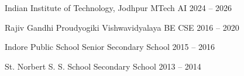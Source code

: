\educationSubsection
    {Indian Institute of Technology, Jodhpur}
    {MTech AI}
    {2024 -- 2026}
   
\educationSubsection
    {Rajiv Gandhi Proudyogiki Vishwavidyalaya}
    {BE CSE}
    {2016 -- 2020}
   
\educationSubsection
    {Indore Public School}
    {Senior Secondary School}
    {2015 -- 2016}
   
\educationSubsection
    {St. Norbert S. S. School}
    {Secondary School}
    {2013 -- 2014}
   